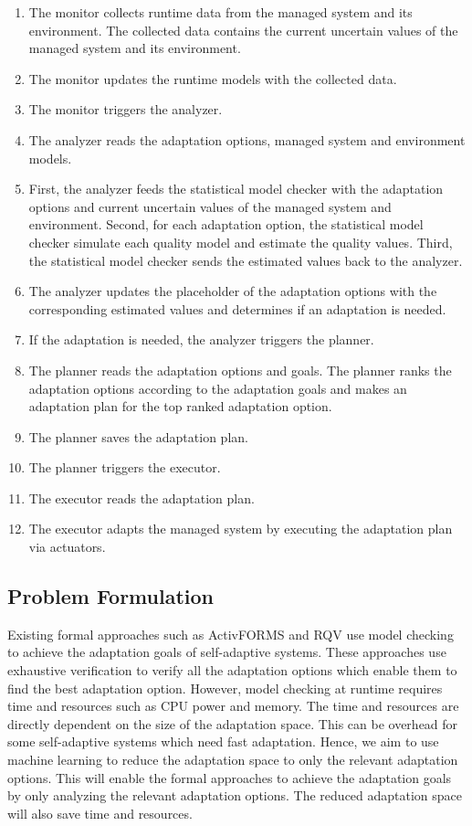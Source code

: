 \documentclass[a4paper,12pt]{article}
\begin{document}
\begin{enumerate}
	\item The monitor collects runtime data from the managed system and its environment. The collected data contains the current uncertain values of the managed system and its environment.
	\item The monitor updates the runtime models with the collected data.
	\item The monitor triggers the analyzer.
	\item The analyzer reads the adaptation options, managed system and environment models. 
	\item First, the analyzer feeds the statistical model checker with the adaptation options and current uncertain values of the managed system and environment. Second, for each adaptation option, the statistical model checker simulate each quality model and estimate the quality values. Third, the statistical model checker sends the estimated values back to the analyzer.
	\item The analyzer updates the placeholder of the adaptation options with the corresponding estimated values and determines if an adaptation is needed.
	\item If the adaptation is needed, the analyzer triggers the planner.
	\item The planner reads the adaptation options and goals. The planner ranks the adaptation options according to the adaptation goals and makes an adaptation plan for the top ranked adaptation option.
	\item The planner saves the adaptation plan.
	\item The planner triggers the executor.
	\item The executor reads the adaptation plan.
	\item The executor adapts the managed system by executing the adaptation plan via actuators.
\end{enumerate}
\subsection{Problem Formulation}
Existing formal approaches such as ActivFORMS and RQV use model checking to achieve the adaptation goals of self-adaptive systems. These approaches use exhaustive verification to verify all the adaptation options which enable them to find the best adaptation option. However, model checking at runtime requires time and resources such as CPU power and memory. The time and resources are directly dependent on the size of the adaptation space. This can be overhead for some self-adaptive systems which need fast adaptation. Hence, we aim to use machine learning to reduce the adaptation space to only the relevant adaptation options. This will enable the formal approaches to achieve the adaptation goals by only analyzing the relevant adaptation options. The reduced adaptation space will also save time and resources.
\end{document}
